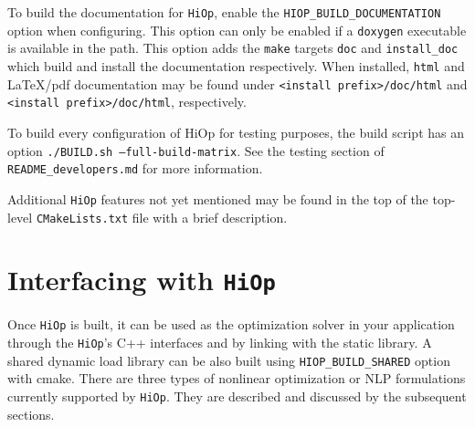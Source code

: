 \documentclass[11pt]{article}
\newcounter{line}
\newcommand{\Hi}{\texttt{HiOp}\xspace}
\begin{document}
To build the documentation for \Hi, enable the 
\texttt{HIOP\_BUILD\_DOCUMENTATION} option when configuring. This option can 
only be enabled if a \texttt{doxygen} executable is available in the path. This 
option adds the \texttt{make} targets \texttt{doc} and \texttt{install\_doc} 
which build and install the documentation respectively. When installed, 
\texttt{html} and \LaTeX{}/pdf documentation may be found under 
\texttt{<install prefix>/doc/html} and \texttt{<install prefix>/doc/html}, 
respectively.

To build every configuration of HiOp for testing purposes, the build script has an option \texttt{./BUILD.sh --full-build-matrix}. See the testing section of \texttt{README\_developers.md} for more information.

Additional \Hi features not yet mentioned may be found in the top of the top-level \texttt{CMakeLists.txt} file with a brief description.

\section{Interfacing with \Hi}
Once \Hi is built, it can be used as the optimization solver in your application through the \Hi's C++ interfaces and by linking with the static library. A shared dynamic load library can be also built using \texttt{HIOP\_BUILD\_SHARED} option with cmake. There are three types of nonlinear optimization or NLP formulations currently supported by \Hi. They are described and discussed by the subsequent sections.
\end{document}
